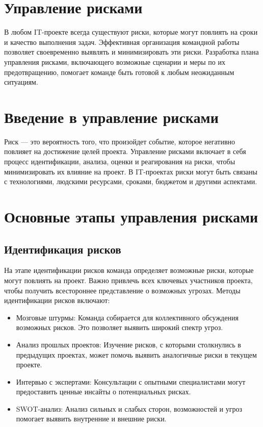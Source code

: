     \section{Управление рисками}
    В любом IT-проекте всегда существуют риски, которые могут повлиять на сроки и качество выполнения задач. Эффективная организация командной работы позволяет своевременно выявлять и минимизировать эти риски. Разработка плана управления рисками, включающего возможные сценарии и меры по их предотвращению, помогает команде быть готовой к любым неожиданным ситуациям.

    \section{Введение в управление рисками}
    Риск — это вероятность того, что произойдет событие, которое негативно повлияет на достижение целей проекта. Управление рисками включает в себя процесс идентификации, анализа, оценки и реагирования на риски, чтобы минимизировать их влияние на проект. В IT-проектах риски могут быть связаны с технологиями, людскими ресурсами, сроками, бюджетом и другими аспектами.

    \section{Основные этапы управления рисками}

    \subsection*{Идентификация рисков}
    На этапе идентификации рисков команда определяет возможные риски, которые могут повлиять на проект. Важно привлечь всех ключевых участников проекта, чтобы получить всестороннее представление о возможных угрозах. Методы идентификации рисков включают:

    \begin{itemize}
        \item Мозговые штурмы: Команда собирается для коллективного обсуждения возможных рисков. Это позволяет выявить широкий спектр угроз.
        \item Анализ прошлых проектов: Изучение рисков, с которыми столкнулись в предыдущих проектах, может помочь выявить аналогичные риски в текущем проекте.
        \item Интервью с экспертами: Консультации с опытными специалистами могут предоставить ценные инсайты о потенциальных рисках.
        \item SWOT-анализ: Анализ сильных и слабых сторон, возможностей и угроз помогает выявить внутренние и внешние риски.
    \end{itemize}
    
